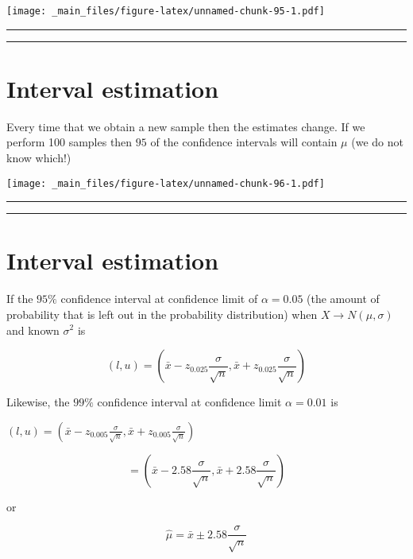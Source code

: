 \documentclass[
]{book}
\begin{document}
\texttt{[image: \_main\_files/figure-latex/unnamed-chunk-95-1.pdf]}

\begin{center}\rule{0.5\linewidth}{0.5pt}\end{center}

\begin{center}\rule{0.5\linewidth}{0.5pt}\end{center}

\hypertarget{interval-estimation-6}{%
\section{Interval estimation}\label{interval-estimation-6}}

Every time that we obtain a new sample then the estimates change. If we perform 100 samples then \(95%
\) of the confidence intervals will contain \(\mu\) (we do not know which!)

\texttt{[image: \_main\_files/figure-latex/unnamed-chunk-96-1.pdf]}

\begin{center}\rule{0.5\linewidth}{0.5pt}\end{center}

\begin{center}\rule{0.5\linewidth}{0.5pt}\end{center}

\hypertarget{interval-estimation-7}{%
\section{Interval estimation}\label{interval-estimation-7}}

If the \(95\%\) confidence interval at confidence limit of \(\alpha=0.05%
\) (the amount of probability that is left out in the probability distribution) when \(X \rightarrow N(\mu, \sigma)\) and known \(\sigma^2\) is

\[(l,u) = (\bar{x} - z_{0.025}\frac{\sigma}{\sqrt{n}},\bar{x} +z_{0.025} \frac{\sigma}{\sqrt{n}})\]

Likewise, the \(99\%\) confidence interval at confidence limit \(\alpha=0.01\) is

\((l,u) = (\bar{x} - z_{0.005}\frac{\sigma}{\sqrt{n}},\bar{x} + z_{0.005}\frac{\sigma}{\sqrt{n}})\)

\[= (\bar{x} - 2.58\frac{\sigma}{\sqrt{n}},\bar{x} + 2.58\frac{\sigma}{\sqrt{n}})\]

or

\[\hat{\mu}=\bar{x} \pm 2.58\frac{\sigma}{\sqrt{n}}\]
\end{document}
